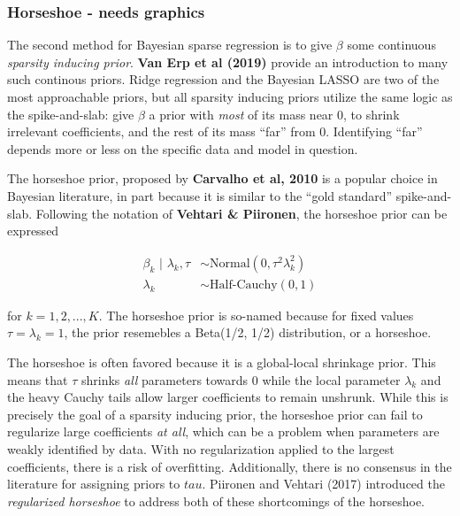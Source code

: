 \documentclass[
]{article}
\begin{document}
\hypertarget{horseshoe---needs-graphics}{%
\subsubsection{Horseshoe - needs
graphics}\label{horseshoe---needs-graphics}}

The second method for Bayesian sparse regression is to give \(\beta\)
some continuous \emph{sparsity inducing prior}. \textbf{Van Erp et al
(2019)} provide an introduction to many such continous priors. Ridge
regression and the Bayesian LASSO are two of the most approachable
priors, but all sparsity inducing priors utilize the same logic as the
spike-and-slab: give \(\beta\) a prior with \emph{most} of its mass near
0, to shrink irrelevant coefficients, and the rest of its mass ``far''
from 0. Identifying ``far'' depends more or less on the specific data
and model in question.

The horseshoe prior, proposed by \textbf{Carvalho et al, 2010} is a
popular choice in Bayesian literature, in part because it is similar to
the ``gold standard'' spike-and-slab. Following the notation of
\textbf{Vehtari \& Piironen}, the horseshoe prior can be expressed

\[
\begin{aligned}
\beta_k \text{ | } \lambda_k, \tau & \sim \text{Normal}(0, \tau^2\lambda_k^2) \\
\lambda_k & \sim \text{Half-Cauchy}(0, 1)
\end{aligned}
\]

for \(k = 1, 2, ..., K\). The horseshoe prior is so-named because for
fixed values \(\tau = \lambda_k = 1\), the prior resemebles a Beta(1/2,
1/2) distribution, or a horseshoe.

The horseshoe is often favored because it is a global-local shrinkage
prior. This means that \(\tau\) shrinks \emph{all} parameters towards 0
while the local parameter \(\lambda_k\) and the heavy Cauchy tails allow
larger coefficients to remain unshrunk. While this is precisely the goal
of a sparsity inducing prior, the horseshoe prior can fail to regularize
large coefficients \emph{at all}, which can be a problem when parameters
are weakly identified by data. With no regularization applied to the
largest coefficients, there is a risk of overfitting. Additionally,
there is no consensus in the literature for assigning priors to \(tau\).
Piironen and Vehtari (2017) introduced the \emph{regularized horseshoe}
to address both of these shortcomings of the horseshoe.
\end{document}
